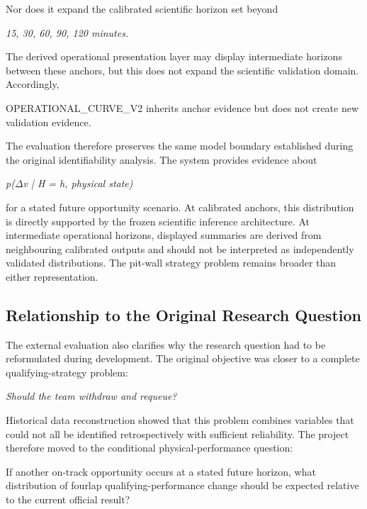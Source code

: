 Nor does it expand the calibrated scientific horizon set beyond

\begin{center}\textit{15, 30, 60, 90, 120 minutes.}\end{center}

The derived operational presentation layer may display intermediate horizons between these anchors, but this does not expand the scientific validation domain. Accordingly,

OPERATIONAL\_CURVE\_V2 inherits anchor evidence but does not create new validation evidence.

The evaluation therefore preserves the same model boundary established during the original identifiability analysis. The system provides evidence about

\begin{center}\textit{p(\ensuremath{\Delta}v | H = h, physical state)}\end{center}

for a stated future opportunity scenario. At calibrated anchors, this distribution is directly supported by the frozen scientific inference architecture. At intermediate operational horizons, displayed summaries are derived from neighbouring calibrated outputs and should not be interpreted as independently validated distributions. The pit-wall strategy problem remains broader than either representation.

\subsection{Relationship to the Original Research Question}
The external evaluation also clarifies why the research question had to be reformulated during development. The original objective was closer to a complete qualifying-strategy problem:

\begin{center}\textit{Should the team withdraw and requeue?}\end{center}

Historical data reconstruction showed that this problem combines variables that could not all be identified retrospectively with sufficient reliability. The project therefore moved to the conditional physical-performance question:

If another on-track opportunity occurs at a stated future horizon, what distribution of fourlap qualifying-performance change should be expected relative to the current official result?

